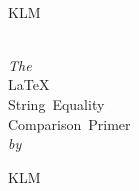 \documentclass[a5paper,10pt,german]{memoir}
\newcommand{\florals}[1]{{\center\floralsFont #1\par}}
\begin{document}
\begingroup%
  \pagestyle{empty}
  \centering
  ~\vspace{2\baselineskip}\\
  \florals{KLM}
  ~\vspace{2\baselineskip}\\

  {\Huge\textit{The}}\\[1\baselineskip]
  {\HUGE\scFont\LaTeX\\[0.25\baselineskip]
  String~Equality\\[0.25\baselineskip]
  Comparison~Primer}\\[1\baselineskip]
  {\Huge\textit{by}}\\[1\baselineskip]
  {\HUGE{}}

  \vspace{2\baselineskip}
  \florals{KLM}
  \vfill
  \thispagestyle{empty} %
  \endgroup
\end{document}
